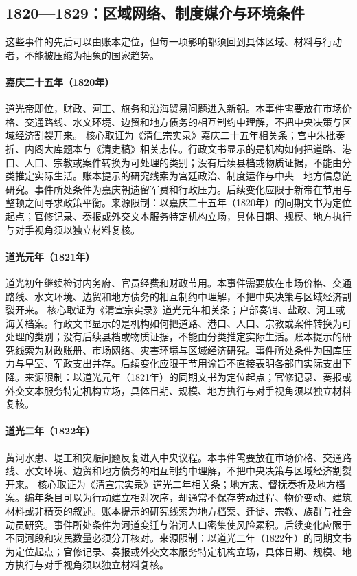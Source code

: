 \subsection{1820—1829：区域网络、制度媒介与环境条件}
这些事件的先后可以由账本定位，但每一项影响都须回到具体区域、材料与行动者，不能被压缩为抽象的国家趋势。
\hypertarget{civic:EQ-1820-DAO-GUANG-ACCESSION}{}\paragraph{嘉庆二十五年（1820年）}道光帝即位，财政、河工、旗务和沿海贸易问题进入新朝。本事件需要放在市场价格、交通路线、水文环境、边贸和地方债务的相互制约中理解，不把中央决策与区域经济割裂开来。 核心取证为《清仁宗实录》嘉庆二十五年相关条；宫中朱批奏折、内阁大库题本与《清史稿》相关志传。行政文书显示的是机构如何把道路、港口、人口、宗教或案件转换为可处理的类别；没有后续县档或物质证据，不能由分类推定实际生活。账本提示的研究线索为宫廷政治、制度运作与中央—地方信息链研究。事件所处条件为嘉庆朝遗留军费和行政压力。后续变化应限于新帝在节用与整顿之间寻求政策平衡。来源限制：以嘉庆二十五年（1820年）的同期文书为定位起点；官修记录、奏报或外交文本服务特定机构立场，具体日期、规模、地方执行与对手视角须以独立材料复核。
\hypertarget{civic:EQ-1821-IMPERIAL-ECONOMY}{}\paragraph{道光元年（1821年）}道光初年继续检讨内务府、官员经费和财政节用。本事件需要放在市场价格、交通路线、水文环境、边贸和地方债务的相互制约中理解，不把中央决策与区域经济割裂开来。 核心取证为《清宣宗实录》道光元年相关条；户部奏销、盐政、河工或海关档案。行政文书显示的是机构如何把道路、港口、人口、宗教或案件转换为可处理的类别；没有后续县档或物质证据，不能由分类推定实际生活。账本提示的研究线索为财政账册、市场网络、灾害环境与区域经济研究。事件所处条件为国库压力与皇室、军政支出并存。后续变化应限于节用谕旨不直接表明各部门实际支出下降。来源限制：以道光元年（1821年）的同期文书为定位起点；官修记录、奏报或外交文本服务特定机构立场，具体日期、规模、地方执行与对手视角须以独立材料复核。
\hypertarget{civic:EQ-1822-YELLOW-RIVER-FLOOD}{}\paragraph{道光二年（1822年）}黄河水患、堤工和灾赈问题反复进入中央议程。本事件需要放在市场价格、交通路线、水文环境、边贸和地方债务的相互制约中理解，不把中央决策与区域经济割裂开来。 核心取证为《清宣宗实录》道光二年相关条；地方志、督抚奏折及地方档案。编年条目可以为行动建立相对次序，却通常不保存劳动过程、物价变动、建筑材料或非精英的叙述。账本提示的研究线索为地方档案、迁徙、宗教、族群与社会动员研究。事件所处条件为河道变迁与沿河人口密集使风险累积。后续变化应限于不同河段和灾民数量必须分开核对。来源限制：以道光二年（1822年）的同期文书为定位起点；官修记录、奏报或外交文本服务特定机构立场，具体日期、规模、地方执行与对手视角须以独立材料复核。
